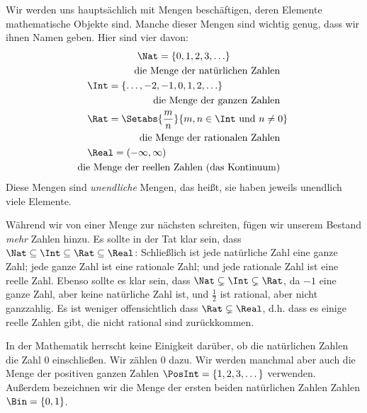 \documentclass[../../../include/open-logic-section]{subfiles}
\begin{document}

\begin{ex}
Wir werden uns hauptsächlich mit Mengen beschäftigen, deren Elemente
mathematische Objekte sind. Manche dieser Mengen sind wichtig genug,
dass wir ihnen Namen geben. Hier sind vier davon:
\begin{multline*}
    \Nat = \{0, 1, 2, 3, \ldots\} \\
    \shoveright{\text{die Menge der natürlichen Zahlen}} \\
    \shoveleft{\Int = \{\ldots, -2, -1, 0, 1, 2, \ldots\}} \\
    \shoveright{\text{die Menge der ganzen Zahlen}} \\
    \shoveleft{\Rat = \Setabs{\frac{m}{n}}{m, n \in \Int\text{ und }n \neq 0}} \\
    \shoveright{\text{die Menge der rationalen Zahlen}} \\
    \shoveleft{\Real = (-\infty, \infty)} \\
    \shoveright{\text{die Menge der reellen Zahlen (das Kontinuum)}} \\
\end{multline*}
Diese Mengen sind \emph{unendliche} Mengen, das heißt, sie haben jeweils
unendlich viele Elemente.

Während wir von einer Menge zur nächsten schreiten, fügen wir unserem 
Bestand \emph{mehr} Zahlen hinzu.
Es sollte in der Tat klar sein, dass $\Nat \subseteq \Int
\subseteq \Rat \subseteq \Real$: Schließlich ist jede natürliche Zahl eine
ganze Zahl; jede ganze Zahl ist eine rationale Zahl; und jede rationale Zahl ist
eine reelle Zahl.
Ebenso sollte es klar sein, dass $\Nat \subsetneq \Int \subsetneq
\Rat$, da $-1$ eine ganze Zahl, aber keine natürliche Zahl ist, und
$\frac{1}{2}$ ist rational, aber nicht ganzzahlig. Es ist weniger offensichtlich
dass $\Rat \subsetneq \Real$, d.h. dass es einige reelle Zahlen gibt,
die nicht rational sind zurückkommen. 

In der Mathematik herrscht keine Einigkeit
darüber, ob die natürlichen Zahlen die Zahl $0$ einschließen. Wir zählen $0$ dazu.
Wir werden manchmal aber auch die Menge der positiven ganzen Zahlen $\PosInt = \{1,
2, 3, \dots\}$ verwenden. Außerdem bezeichnen wir die Menge der ersten beiden natürlichen Zahlen
Zahlen $\Bin = \{0, 1\}$.
\end{ex}
\end{document}
